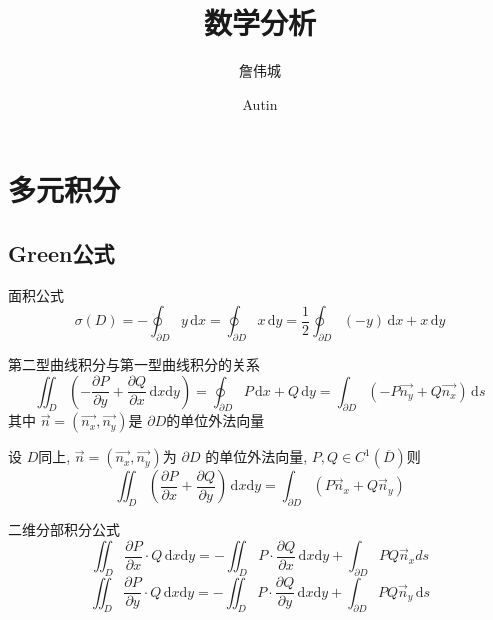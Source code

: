 \documentclass[lang=cn,12pt,color=green,fontset=none]{elegantbook}
\title{数学分析}
\subtitle{詹伟城}
\author{Autin}
\begin{document}
\maketitle
\frontmatter

\tableofcontents

\mainmatter

\chapter{多元积分}


\section{Green公式}

\begin{theorem}{面积公式}
     $$
     \sigma\left( D \right) = -\oint_{\partial D    } y \,\mathrm{d}x = \oint_{ \partial D} x \,\mathrm{d}y = \frac{1}{2} \oint_{\partial D} \left( -y \right)\,\mathrm{d}x +  x \,\mathrm{d}y 
     $$
\end{theorem}

\begin{proposition}{第二型曲线积分与第一型曲线积分的关系}
    $$
    \iint_{D}\left( - \frac{\partial P}{\partial y} +  \frac{\partial Q}{\partial x}  \,\mathrm{d}x \mathrm{d}y \right) = \oint_{\partial D} P \,\mathrm{d}x+  Q \,\mathrm{d}y= \int_{\partial D} \left( -P \vec{n_{y}} +  Q \vec{n_{x}}\right)\,\mathrm{d}s  
    $$其中 $  \vec{n}= \left(  \vec{n_{x}},\vec{n_{y}} \right)  $是 $ \partial D $的单位外法向量  
\end{proposition} 

\begin{corollary}
    
    设 $  D $同上, $ \vec{n} =\left( \vec{n_{x}  },\vec{n_{y}} \right)  $为 $ \partial D $   的单位外法向量, $  P,Q \in  C^{1}\left(  \overline{D} \right)  $则 $$
    \iint_{D} \left(  \frac{\partial P}{\partial x}+  \frac{\partial Q}{\partial y} \right) \,\mathrm{d}x \mathrm{d} y= \int_{ \partial D} \left(  P \vec{n }_{x} +  Q \vec{n}_{y} \right)  
    $$ 
\end{corollary}

\begin{corollary}{二维分部积分公式}
     $$
      \iint_{D} \frac{\partial P}{\partial x} \cdot Q \,\mathrm{d}x \mathrm{d}y = - \iint_{D} P \cdot  \frac{\partial Q}{\partial x} \,\mathrm{d}x \mathrm{d}y +  \int_{ \partial D} PQ \vec{n  }_{x} ds
     $$ $$
     \iint_{D} \frac{\partial P}{\partial y}\cdot Q \,\mathrm{d}x \mathrm{d} y = - \iint_{D} P \cdot \frac{\partial Q}{\partial y} \,\mathrm{d}x  \mathrm{d}y +  \int_{\partial D} PQ \vec{n}_{y} \,\mathrm{d}s
     $$
\end{corollary}
\end{document}

